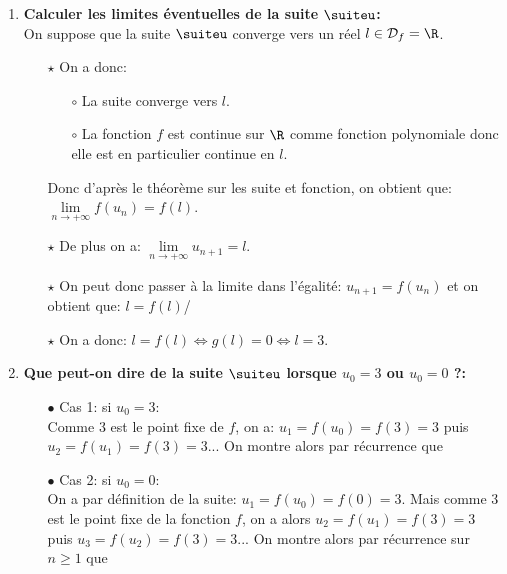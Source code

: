 \documentclass[a4paper, 11pt]{article}
\begin{document}
\begin{correction}
\begin{enumerate}
\item \textbf{Calculer les limites \'eventuelles de la suite $\suiteu$:}\\
\noindent On suppose que la suite $\suiteu$ converge vers un r\'eel $l\in\mathcal{D}_f=\R$.
\begin{itemize}
\item[$\star$] On a donc:
\begin{itemize}
\item[$\circ$] La suite converge vers $l$.
\item[$\circ$] La fonction $f$ est continue sur $\R$ comme fonction polynomiale donc elle est en particulier continue en $l$.
\end{itemize}
Donc d'apr\`{e}s le th\'eor\`{e}me sur les suite et fonction, on obtient que: $\lim\limits_{n\to +\infty} f(u_n)=f(l)$.
\item[$\star$] De plus on a: $\lim\limits_{n\to +\infty} u_{n+1}=l$.
\item[$\star$] On peut donc passer \`{a} la limite dans l'\'egalit\'e: $u_{n+1}=f(u_n)$ et on obtient que: $l=f(l)$/
\item[$\star$] On a donc: $l=f(l)\Leftrightarrow g(l)=0\Leftrightarrow l=3$. \\
\noindent {}
\end{itemize}
\item \textbf{Que peut-on dire de la suite $\suiteu$ lorsque $u_0=3$ ou $u_0=0$ ?:}
\begin{itemize}
\item[$\bullet$] Cas 1: si $u_0=3$:\\
\noindent Comme 3 est le point fixe de $f$, on a: $u_1=f(u_0)=f(3)=3$ puis $u_2=f(u_1)=f(3)=3$... On montre alors par r\'ecurrence que

\item[$\bullet$] Cas 2: si $u_0=0$:\\
\noindent On a par d\'efinition de la suite: $u_1=f(u_0)=f(0)=3$. Mais comme 3 est le point fixe de la fonction $f$, on a alors $u_2=f(u_1)=f(3)=3$ puis $u_3=f(u_2)=f(3)=3$... On montre alors par r\'ecurrence sur $n\geq 1$ que 


\end{itemize}
\end{enumerate}
\end{correction}
\end{document}
